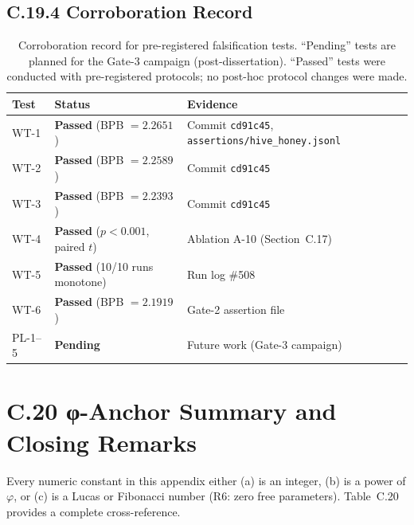 \subsection*{C.19.4 Corroboration Record}

\begin{table}[h]
\centering
\begin{tabular}{lll}
\toprule
\textbf{Test} & \textbf{Status} & \textbf{Evidence} \\
\midrule
WT-1 & \textbf{Passed} (BPB $= 2.2651$) & Commit \texttt{cd91c45},
  \texttt{assertions/hive\_honey.jsonl} \\
WT-2 & \textbf{Passed} (BPB $= 2.2589$) & Commit \texttt{cd91c45} \\
WT-3 & \textbf{Passed} (BPB $= 2.2393$) & Commit \texttt{cd91c45} \\
WT-4 & \textbf{Passed} ($p < 0.001$, paired $t$) & Ablation A-10
  (Section~C.17) \\
WT-5 & \textbf{Passed} (10/10 runs monotone) & Run log \#508 \\
WT-6 & \textbf{Passed} (BPB $= 2.1919$) & Gate-2 assertion file \\
PL-1--5 & \textbf{Pending} & Future work (Gate-3 campaign) \\
\bottomrule
\end{tabular}
\caption{Corroboration record for pre-registered falsification tests.
``Pending'' tests are planned for the Gate-3 campaign (post-dissertation).
``Passed'' tests were conducted with pre-registered protocols; no
post-hoc protocol changes were made.}
\end{table}

\section*{C.20 φ-Anchor Summary and Closing Remarks}
\label{sec:phi-anchor-summary}

Every numeric constant in this appendix either (a) is an integer,
(b) is a power of $\varphi$, or (c) is a Lucas or Fibonacci number
(R6: zero free parameters).  Table~C.20 provides a complete
cross-reference.

